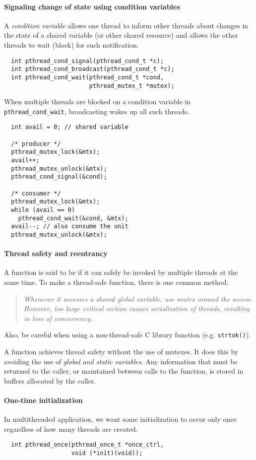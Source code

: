\documentclass{memo}
\begin{document}
\paragraph{Signaling change of state using condition variables}
A {\em condition variable\/} allows one thread to inform other threads about
changes in the state of a shared variable (or other shared resource) and
allows the other threads to wait (block) for such notification.
\begin{verbatim}
  int pthread_cond_signal(pthread_cond_t *c);
  int pthread_cond_broadcast(pthread_cond_t *c);
  int pthread_cond_wait(pthread_cond_t *cond,
                        pthread_mutex_t *mutex);
\end{verbatim}
When multiple threads are blocked on a condition variable in
\verb+pthread_cond_wait+, broadcasting wakes up all such threads.
\begin{verbatim}
  int avail = 0; // shared variable

  /* producer */
  pthread_mutex_lock(&mtx);
  avail++;
  pthread_mutex_unlock(&mtx);
  pthread_cond_signal(&cond);

  /* consumer */
  pthread_mutex_lock(&mtx);
  while (avail == 0)
    pthread_cond_wait(&cond, &mtx);
  avail--; // also consume the unit
  pthread_mutex_unlock(&mtx);
\end{verbatim}

\paragraph{Thread safety and reentrancy}
A function is said to be  if it can safely be invoked by
multiple threads at the same time. To make a thread-safe function, there is
one common method:
\begin{quote}
 {\em  Whenever it accesses a shared global variable, use mutex around the access. However, too large critical section causes {\em serialization\/} of threads, resulting in loss of concurrency. }
\end{quote}
Also, be careful when using a non-thread-safe C library function
(e.g. \verb+strtok()+). 

A  function achieves thread safety without the use of
mutexes. It does this by avoiding the use of {\em global and static
  variables\/}. Any information that must be returned to the caller, or
maintained between calls to the function, is stored in buffers allocated by the
caller. 

\paragraph{One-time initialization}
In multithreaded application, we want some initialization to occur only once
regardless of how many threads are created.
\begin{verbatim}
  int pthread_once(pthread_once_t *once_ctrl, 
                   void (*init)(void));
\end{verbatim}
\end{document}
